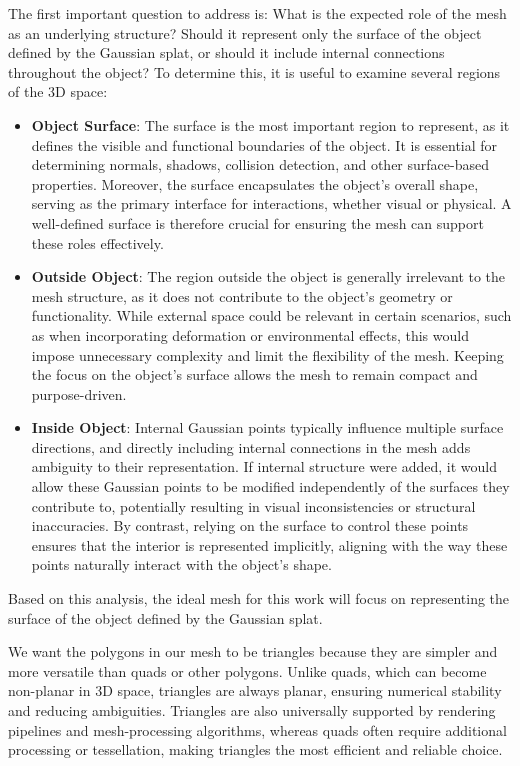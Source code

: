 The first important question to address is: What is the expected role of the mesh as an underlying structure? Should it represent only the surface of the object defined by the Gaussian splat, or should it include internal connections throughout the object? To determine this, it is useful to examine several regions of the 3D space:

\begin{itemize}
    \item \textbf{Object Surface}: The surface is the most important region to represent, as it defines the visible and functional boundaries of the object. It is essential for determining normals, shadows, collision detection, and other surface-based properties. Moreover, the surface encapsulates the object’s overall shape, serving as the primary interface for interactions, whether visual or physical. A well-defined surface is therefore crucial for ensuring the mesh can support these roles effectively.
    \item \textbf{Outside Object}: The region outside the object is generally irrelevant to the mesh structure, as it does not contribute to the object’s geometry or functionality. While external space could be relevant in certain scenarios, such as when incorporating deformation or environmental effects, this would impose unnecessary complexity and limit the flexibility of the mesh. Keeping the focus on the object’s surface allows the mesh to remain compact and purpose-driven.
    \item \textbf{Inside Object}: Internal Gaussian points typically influence multiple surface directions, and directly including internal connections in the mesh adds ambiguity to their representation. If internal structure were added, it would allow these Gaussian points to be modified independently of the surfaces they contribute to, potentially resulting in visual inconsistencies or structural inaccuracies. By contrast, relying on the surface to control these points ensures that the interior is represented implicitly, aligning with the way these points naturally interact with the object’s shape.
\end{itemize}

Based on this analysis, the ideal mesh for this work will focus on representing the surface of the object defined by the Gaussian splat.

We want the polygons in our mesh to be triangles because they are simpler and more versatile than quads or other polygons. Unlike quads, which can become non-planar in 3D space, triangles are always planar, ensuring numerical stability and reducing ambiguities. Triangles are also universally supported by rendering pipelines and mesh-processing algorithms, whereas quads often require additional processing or tessellation, making triangles the most efficient and reliable choice.

